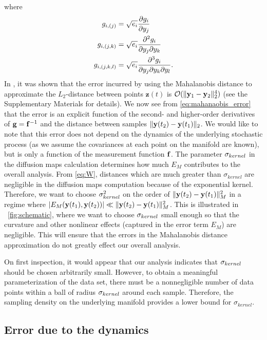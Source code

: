 %
where
%
\begin{equation}
\begin{aligned}
g_{i,(j)} &= \sqrt{e_i} \frac{\partial g_i}{\partial y_j}
\\
g_{i,(j,k)} &= \sqrt{e_i}  \frac{\partial^2 g_i}{\partial y_j \partial y_k}
\\
g_{i,(j,k,l)} &= \sqrt{e_i}  \frac{\partial^3 g_i}{\partial y_j \partial y_k \partial y_l} .
\end{aligned}
\end{equation}
%
In \cite{singer2008non}, it was shown that the error incurred by using the Mahalanobis distance to approximate the $L_2$-distance between points $\mathbf{z}(t)$ is $\mathcal{O} (\|\mathbf{y}_1 - \mathbf{y}_2 \|_2^4 )$ (see the Supplementary Materials for details).
%
We now see from \eqref{eq:mahanaobis_error} that the error is an explicit function of the second- and higher-order derivatives of $\mathbf{g} = \mathbf{f}^{-1}$ and the distance between samples $\| \mathbf{y}(t_2) - \mathbf{y}(t_1) \|_2$.
%
We would like to note that this error does not depend on the dynamics of the underlying stochastic process (as we assume the covariances at each point on the manifold are known), but is only a function of the measurement function $\mathbf{f}$.
%
The parameter $\sigma_{kernel}$ in the diffusion maps calculation determines how much $E_M$ contributes to the overall analysis.
%
From \eqref{eq:W}, distances which are much greater than $\sigma_{kernel}$ are negligible in the diffusion maps computation because of the exponential kernel.
%
Therefore, we want to choose $\sigma_{kernel}^2$ on the order of $\|\mathbf{y}(t_2) - \mathbf{y}(t_1)\|^2_M$ in a regime where $| E_M(\mathbf{y}(t_1), \mathbf{y}(t_2))|  \ll \|\mathbf{y}(t_2) - \mathbf{y}(t_1)\|^2_M$.
%
This is illustrated in \fig~\ref{fig:schematic}, where we want to choose $\sigma_{kernel}$ small enough so that the curvature and other nonlinear effects (captured in the error term $E_M$) are negligible.
%
This will ensure that the errors in the Mahalanobis distance approximation do not greatly effect our overall analysis.

On first inspection, it would appear that our analysis indicates that $\sigma_{kernel}$ should be chosen arbitrarily small.
%
However, to obtain a meaningful parameterization of the data set, there must be a nonnegligible number of data points within a ball of radius $\sigma_{kernel}$ around each sample.
%
Therefore, the sampling density on the underlying manifold provides a lower bound for $\sigma_{kernel}$.

\subsection{Error due to the dynamics} \label{subsec:cov_est}

